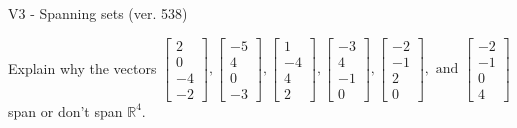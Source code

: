 \begin{exercise}
  \begin{exerciseTitle}V3 - Spanning sets (ver. 538)\end{exerciseTitle}
  \begin{exerciseStatement}
    Explain why the vectors \(\left[\begin{array}{r}
2 \\
0 \\
-4 \\
-2
\end{array}\right] , \left[\begin{array}{r}
-5 \\
4 \\
0 \\
-3
\end{array}\right] , \left[\begin{array}{r}
1 \\
-4 \\
4 \\
2
\end{array}\right] , \left[\begin{array}{r}
-3 \\
4 \\
-1 \\
0
\end{array}\right] , \left[\begin{array}{r}
-2 \\
-1 \\
2 \\
0
\end{array}\right] , \text{ and } \left[\begin{array}{r}
-2 \\
-1 \\
0 \\
4
\end{array}\right]\) span or don't span \(\mathbb{R}^4\). 
	



\end{exerciseStatement}
\end{exercise}
